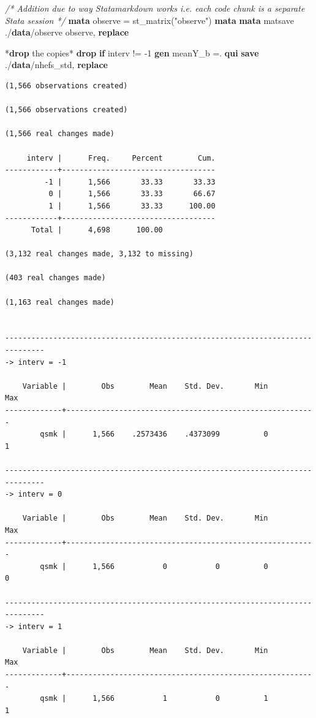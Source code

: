 \documentclass[
  10pt,
]{book}
\newenvironment{Shaded}{\begin{snugshade}}{\end{snugshade}}
\newcommand{\CommentTok}[1]{\textcolor[rgb]{0.56,0.35,0.01}{\textit{#1}}}
\newcommand{\KeywordTok}[1]{\textcolor[rgb]{0.13,0.29,0.53}{\textbf{#1}}}
\newcommand{\NormalTok}[1]{#1}
\newcommand{\StringTok}[1]{\textcolor[rgb]{0.31,0.60,0.02}{#1}}
\begin{document}
\begin{Shaded}
\begin{Highlighting}[]
\CommentTok{/* Addition due to way Statamarkdown works }
\CommentTok{i.e. each code chunk is a separate Stata session */}
\KeywordTok{mata}\NormalTok{ observe = st\_matrix(}\StringTok{"observe"}\NormalTok{)}
\KeywordTok{mata} \KeywordTok{mata}\NormalTok{ matsave ./}\KeywordTok{data}\NormalTok{/observe observe, }\KeywordTok{replace}

\NormalTok{*}\KeywordTok{drop}\NormalTok{ the copies*}
\KeywordTok{drop} \KeywordTok{if}\NormalTok{ interv != {-}1}
\KeywordTok{gen}\NormalTok{ meanY\_b =.}
\KeywordTok{qui} \KeywordTok{save}\NormalTok{ ./}\KeywordTok{data}\NormalTok{/nhefs\_std, }\KeywordTok{replace}
\end{Highlighting}
\end{Shaded}

\begin{verbatim}
(1,566 observations created)

(1,566 observations created)

(1,566 real changes made)

     interv |      Freq.     Percent        Cum.
------------+-----------------------------------
         -1 |      1,566       33.33       33.33
          0 |      1,566       33.33       66.67
          1 |      1,566       33.33      100.00
------------+-----------------------------------
      Total |      4,698      100.00

(3,132 real changes made, 3,132 to missing)

(403 real changes made)

(1,163 real changes made)


-------------------------------------------------------------------------------
-> interv = -1

    Variable |        Obs        Mean    Std. Dev.       Min        Max
-------------+---------------------------------------------------------
        qsmk |      1,566    .2573436    .4373099          0          1

-------------------------------------------------------------------------------
-> interv = 0

    Variable |        Obs        Mean    Std. Dev.       Min        Max
-------------+---------------------------------------------------------
        qsmk |      1,566           0           0          0          0

-------------------------------------------------------------------------------
-> interv = 1

    Variable |        Obs        Mean    Std. Dev.       Min        Max
-------------+---------------------------------------------------------
        qsmk |      1,566           1           0          1          1


\end{verbatim}
\end{document}
